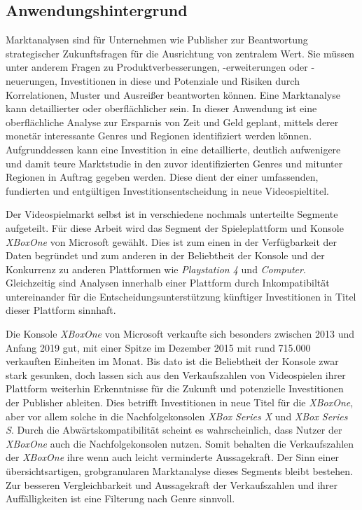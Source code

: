 \documentclass[usegeometry=true]{scrartcl}
\begin{document}
\subsection{Anwendungshintergrund}
Marktanalysen sind für Unternehmen wie Publisher zur Beantwortung strategischer Zukunftsfragen für die Ausrichtung von zentralem Wert.
Sie müssen unter anderem Fragen zu Produktverbesserungen, -erweiterungen oder -neuerungen, Investitionen in diese und Potenziale und Risiken durch Korrelationen, Muster und Ausreißer beantworten können.\cite{Fleig.2020}
Eine Marktanalyse kann detaillierter oder oberflächlicher sein. 
In dieser Anwendung ist eine oberflächliche Analyse zur Ersparnis von Zeit und Geld geplant, 
mittels derer monetär interessante Genres und Regionen identifiziert werden können.
Aufgrunddessen kann eine Investition in eine detaillierte, deutlich aufwenigere und damit teure Marktstudie in den zuvor identifizierten Genres 
und mitunter Regionen in Auftrag gegeben werden. 
Diese dient der einer umfassenden, fundierten und entgültigen Investitionsentscheidung in neue Videospieltitel.

Der Videospielmarkt selbst ist in verschiedene nochmals unterteilte Segmente aufgeteilt. 
Für diese Arbeit wird das Segment der Spieleplattform und Konsole \textit{XBoxOne} von Microsoft gewählt.
Dies ist zum einen in der Verfügbarkeit der Daten begründet und zum anderen in der Beliebtheit der Konsole und der Konkurrenz zu anderen Plattformen wie \textit{Playstation 4} und \textit{Computer}.
Gleichzeitig sind Analysen innerhalb einer Plattform durch Inkompatibiltät untereinander für die Entscheidungsunterstützung künftiger Investitionen in Titel dieser Plattform sinnhaft. 

Die Konsole \textit{XBoxOne} von Microsoft verkaufte sich besonders zwischen 2013 und Anfang 2019 gut, mit einer Spitze im Dezember 2015 mit rund 715.000 verkauften Einheiten im Monat.
Bis dato ist die Beliebtheit der Konsole zwar stark gesunken, doch lassen sich aus den Verkaufszahlen von Videospielen ihrer Plattform weiterhin Erkenntnisse für die Zukunft 
und potenzielle Investitionen der Publisher ableiten.\cite{Statista.2022}
Dies betrifft Investitionen in neue Titel für die \textit{XBoxOne}, aber vor allem solche in die Nachfolgekonsolen \textit{XBox Series X} und \textit{XBox Series S}. 
Durch die Abwärtskompatibilität scheint es wahrscheinlich, dass Nutzer der \textit{XBoxOne} auch die Nachfolgekonsolen nutzen.\cite{GamesWirtschaft.2021} 
Somit behalten die Verkaufszahlen der \textit{XBoxOne} ihre wenn auch leicht verminderte Aussagekraft.
Der Sinn einer übersichtsartigen, grobgranularen Marktanalyse dieses Segments bleibt bestehen.
Zur besseren Vergleichbarkeit und Aussagekraft der Verkaufszahlen und ihrer Auffälligkeiten ist eine Filterung nach Genre sinnvoll.
\end{document}
